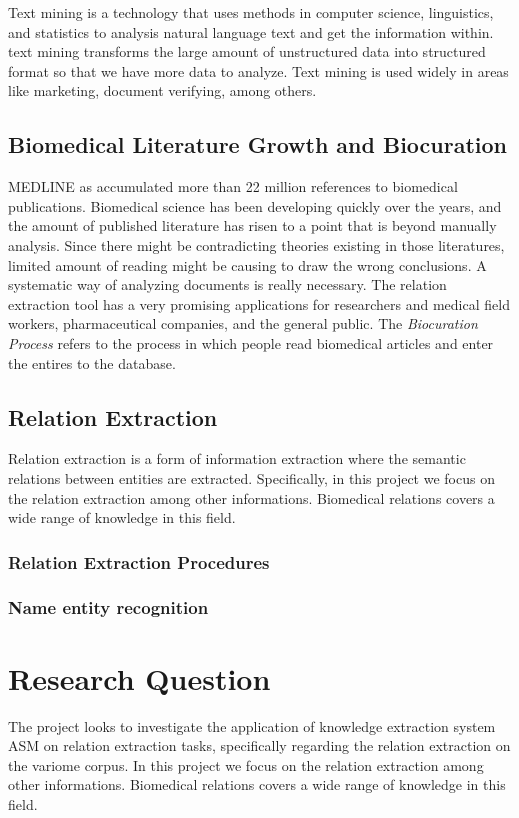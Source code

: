 Text mining is a technology that uses methods in computer science, linguistics, and statistics to analysis natural language text and get the information within.  text mining transforms the large amount of unstructured data into structured format so that we have more data to analyze. Text mining is used widely in areas like marketing, document verifying, among others.

\subsection{Biomedical Literature Growth and Biocuration}
MEDLINE as accumulated more than 22 million references to biomedical publications\cite{MEDLINE:2015:Online}.
 Biomedical science has been developing quickly over the years, and the amount of published literature has risen to a point that is beyond manually analysis. Since there might be contradicting theories existing in those literatures, 	limited amount of reading might be causing to draw the wrong conclusions. A systematic way of analyzing documents is really necessary. The relation extraction tool has a very promising applications for researchers and medical field workers, pharmaceutical companies, 	and the general public.
 The \emph{Biocuration Process} refers to the process in which people read biomedical articles and enter the entires to the database. 

\subsection{Relation Extraction} 
Relation extraction is a form of information extraction where the semantic relations between entities are extracted.
Specifically, in this project we focus on the relation extraction among other informations. Biomedical relations covers a wide range of knowledge in this field.

\subsubsection{Relation Extraction Procedures}
\subsubsection{Name entity recognition}

\section{Research Question}\label{section1.2}%
The project looks to investigate the application of  knowledge extraction system ASM on relation extraction tasks, specifically regarding the relation extraction on the variome corpus.
In this project we focus on the relation extraction among other informations. Biomedical relations covers a wide range of knowledge in this field.


